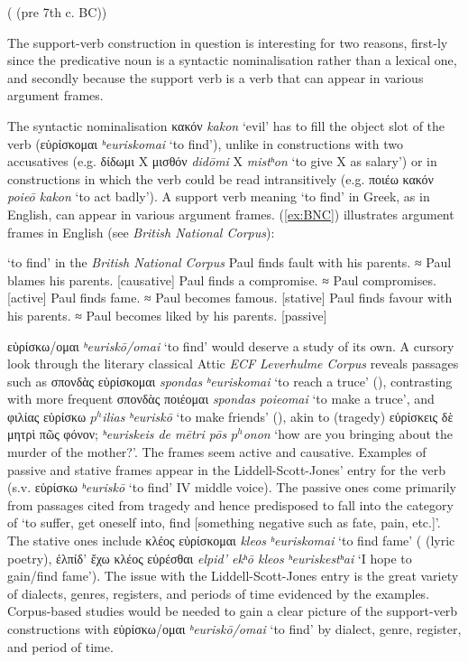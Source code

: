 \documentclass[output=paper,colorlinks,citecolor=brown]{langscibook}
\begin{document}
\hspace*{\fill}( (pre 7th c. BC))
\z

The support-verb construction in question is interesting for two reasons, first-ly since the predicative noun is a syntactic nominalisation rather than a lexical one, and secondly because the support verb is a verb that can appear in various argument frames. 


The syntactic nominalisation κακόν \textit{kakon} ‘evil' has to fill the object slot of the verb (εὑρίσκομαι \textit{ʰeuriskomai} ‘to find'), unlike in constructions with two accusatives (e.g. δίδωμι Χ μισθόν \textit{didōmi} X \textit{mistʰon} ‘to give X as salary’) or in constructions in which the verb could be read intransitively (e.g. ποιέω κακόν \textit{poieō kakon} ‘to act badly’). A support verb meaning ‘to find’ in Greek, as in English, can appear in various argument frames. (\ref{ex:BNC}) illustrates argument frames in English (see \textit{British National Corpus}):

\ea\label{ex:BNC}

‘to find’ in the \textit{British National Corpus}
\ea Paul finds fault with his parents. ≈ Paul blames his parents. [causative]
\ex Paul finds a compromise. ≈ Paul compromises. [active]
\ex Paul finds fame. ≈ Paul becomes famous. [stative] 
\ex Paul finds favour with his parents. ≈ Paul becomes liked by his parents. [passive]

\z
\z

εὑρίσκω/ομαι \textit{ʰeuriskō/omai} ‘to find’ would deserve a study of its own. A cursory look through the literary classical Attic \textit{ECF Leverhulme Corpus} reveals passages such as σπονδὰς εὑρίσκομαι \textit{spondas ʰeuriskomai} ‘to reach a truce’ (), contrasting with more frequent σπονδὰς ποιέομαι \textit{spondas poieomai} ‘to make a truce', and φιλίας εὑρίσκω \textit{$p^h$ilias ʰeuriskō} ‘to make friends’ (), akin to  (tragedy) εὑρίσκεις δὲ μητρὶ πῶς φόνον; \textit{ʰeuriskeis de mētri pōs $p^h$onon } ‘how are you bringing about the murder of the mother?’. The frames seem active and causative. Examples of passive and stative frames appear in the Liddell-Scott-Jones' entry for the verb (s.v. εὑρίσκω \textit{ʰeuriskō} ‘to find' IV middle voice). The passive ones come primarily from passages cited from tragedy and hence predisposed to fall into the category of ‘to suffer, get oneself into, find [something negative such as fate, pain, etc.]’. The stative ones include κλέος εὑρίσκομαι \textit{kleos ʰeuriskomai} ‘to find fame’ ( (lyric poetry),  ἐλπίδ’ ἔχω κλέος εὑρέσθαι \textit{elpid’ ekʰō kleos ʰeuriskestʰai} ‘I hope to gain/find fame’). The issue with the Liddell-Scott-Jones entry is the great variety of dialects, genres, registers, and periods of time evidenced by the examples. Corpus-based studies would be needed to gain a clear picture of the support-verb constructions with εὑρίσκω/ομαι \textit{ʰeuriskō/omai} ‘to find’ by dialect, genre, register, and period of time.
\end{document}
